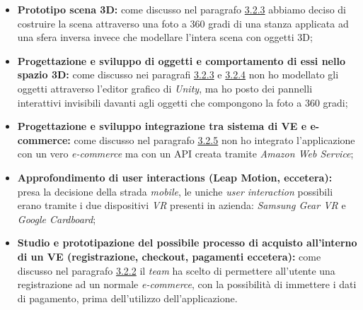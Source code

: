 \begin{itemize}
	\item \textbf{Prototipo scena 3D:} come discusso nel paragrafo \hyperlink{3.2.3}{3.2.3} abbiamo deciso di costruire la scena attraverso una foto a 360 gradi di una stanza applicata ad una sfera inversa invece che modellare l'intera scena con oggetti 3D;
	\item \textbf{Progettazione e sviluppo di oggetti e comportamento di essi nello spazio 3D:} come discusso nei paragrafi \hyperlink{3.2.3}{3.2.3} e \hyperlink{3.2.4}{3.2.4} non ho modellato gli oggetti attraverso l'editor grafico di \textit{Unity}, ma ho posto dei pannelli interattivi invisibili davanti agli oggetti che compongono la foto a 360 gradi;
	\item \textbf{Progettazione e sviluppo integrazione tra sistema di VE e e-commerce:} come discusso nel paragrafo \hyperlink{3.2.5}{3.2.5} non ho integrato l'applicazione con un vero \textit{e-commerce} ma con un API creata tramite \textit{Amazon Web Service};
	\item \textbf{Approfondimento di user interactions (Leap Motion, eccetera):} presa la decisione della strada \textit{mobile}, le uniche \textit{user interaction} possibili erano tramite i due dispositivi \textit{VR} presenti in azienda: \textit{Samsung Gear VR} e \textit{Google Cardboard};
	\item \textbf{Studio e prototipazione del possibile processo di acquisto all’interno di un VE (registrazione, checkout, pagamenti eccetera):} come discusso nel paragrafo \hyperlink{3.2.2}{3.2.2} il \textit{team} ha scelto di permettere all'utente una registrazione ad un normale \textit{e-commerce}, con la possibilità di immettere i dati di pagamento, prima dell'utilizzo dell'applicazione.
\end{itemize} 

